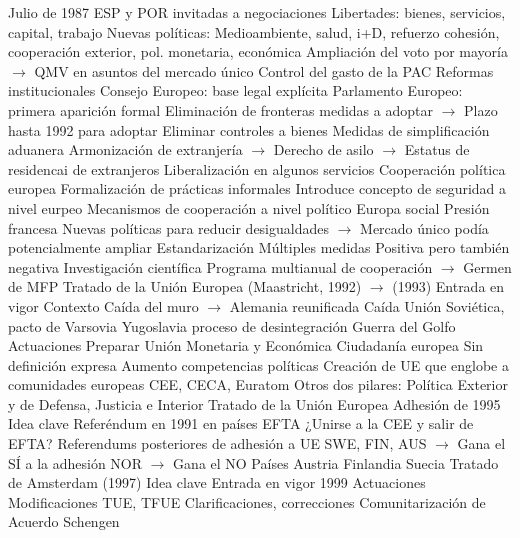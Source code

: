 \documentclass{nuevotema}
\begin{document}
\begin{esquemal}
				\4[] Julio de 1987
				\4 ESP y POR invitadas a negociaciones
				 Libertades: bienes, servicios, capital, trabajo
				\4 Nuevas políticas:
				\4[] Medioambiente, salud, i+D, refuerzo cohesión,
				\4[] cooperación exterior, pol. monetaria, económica
				\4 Ampliación del voto por mayoría
				\4[] $\to$  QMV en asuntos del mercado único
				\4 Control del gasto de la PAC
				\4 Reformas institucionales
				\4[] Consejo Europeo: base legal explícita
				\4[] Parlamento Europeo: primera aparición formal
				\4 Eliminación de fronteras
				 medidas a adoptar
				\4[] $\to$ Plazo hasta 1992 para adoptar
				\4[] Eliminar controles a bienes
				\4[] Medidas de simplificación aduanera
				\4[] Armonización de extranjería
				\4[] $\to$ Derecho de asilo
				\4[] $\to$ Estatus de residencai de extranjeros
				\4[] Liberalización en algunos servicios
				\4 Cooperación política europea
				\4[] Formalización de prácticas informales
				\4[] Introduce concepto de seguridad a nivel eurpeo
				\4[] Mecanismos de cooperación a nivel político
				\4 Europa social
				\4[] Presión francesa
				\4[] Nuevas políticas para reducir desigualdades
				\4[] $\to$ Mercado único podía potencialmente ampliar
				\4 Estandarización
				\4[] Múltiples medidas
				\4[] Positiva pero también negativa
				\4 Investigación científica
				\4[] Programa multianual de cooperación
				\4[] $\to$ Germen de MFP
		\2 Tratado de la Unión Europea (Maastricht, 1992) $\to$ (1993)
			\3 Entrada en vigor
			\3 Contexto
				\4 Caída del muro $\to$ Alemania reunificada
				\4 Caída Unión Soviética, pacto de Varsovia
				\4 Yugoslavia proceso de desintegración
				\4 Guerra del Golfo
			\3 Actuaciones
				\4 Preparar Unión Monetaria y Económica
				\4 Ciudadanía europea
				\4[] Sin definición expresa
				\4 Aumento competencias políticas
				\4 Creación de UE que englobe a comunidades europeas
				\4[] CEE, CECA, Euratom
				\4 Otros dos pilares: Política Exterior y de Defensa, Justicia e Interior
				\4 Tratado de la Unión Europea
		\2 Adhesión de 1995
			\3 Idea clave
				\4 Referéndum en 1991 en países EFTA
				\4[] ¿Unirse a la CEE y salir de EFTA?
				\4 Referendums posteriores de adhesión a UE
				\4[] SWE, FIN, AUS
				\4[] $\to$ Gana el SÍ a la adhesión
				\4[] NOR
				\4[] $\to$ Gana el NO
			\3 Países
				\4 Austria
				\4 Finlandia
				\4 Suecia
		\2 Tratado de Amsterdam (1997)
			\3 Idea clave
				\4 Entrada en vigor 1999
			\3 Actuaciones
				\4 Modificaciones TUE, TFUE
				\4[$\to$] Clarificaciones, correcciones
				\4 Comunitarización de Acuerdo Schengen

\end{esquemal}
\end{document}

